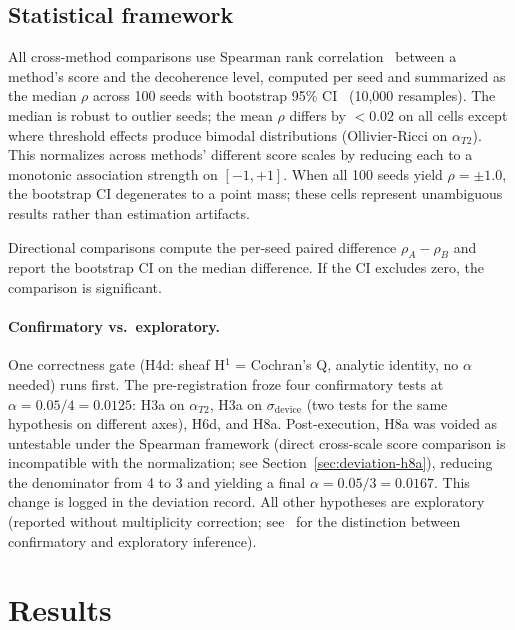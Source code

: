 \documentclass[11pt]{article}
\begin{document}
\subsection{Statistical framework}

All cross-method comparisons use Spearman rank
correlation~\citep{spearman1904proof} between a method's score and the
decoherence level, computed per seed and summarized as the median
$\rho$ across 100 seeds with bootstrap 95\%
CI~\citep{efron1979bootstrap} (10,000 resamples).  The median is robust
to outlier seeds; the mean $\rho$ differs by $< 0.02$ on all cells
except where threshold effects produce bimodal distributions (Ollivier-Ricci
on $\alpha_{T2}$).  This normalizes across methods' different score
scales by reducing each to a monotonic association strength on $[-1, +1]$.
When all 100 seeds yield $\rho = \pm 1.0$, the bootstrap CI degenerates
to a point mass; these cells represent unambiguous results rather than
estimation artifacts.

Directional comparisons compute the per-seed paired difference
$\rho_A - \rho_B$ and report the bootstrap CI on the median difference.
If the CI excludes zero, the comparison is significant.

\paragraph{Confirmatory vs.\ exploratory.}
One correctness gate (H4d: sheaf H$^1$ = Cochran's Q, analytic
identity, no $\alpha$ needed) runs first.  The pre-registration froze
four confirmatory tests at $\alpha = 0.05/4 = 0.0125$: H3a on
$\alpha_{T2}$, H3a on $\sigma_\text{device}$ (two tests for the same
hypothesis on different axes), H6d, and H8a.  Post-execution, H8a was
voided as untestable under the Spearman framework (direct cross-scale
score comparison is incompatible with the normalization; see
Section~\ref{sec:deviation-h8a}), reducing the denominator from 4 to 3
and yielding a final $\alpha = 0.05/3 = 0.0167$.  This change is logged
in the deviation record.  All other hypotheses are exploratory (reported without
multiplicity correction; see~\citet{benjamini1995controlling} for
the distinction between confirmatory and exploratory inference).

\section{Results}
\label{sec:results}
\end{document}
